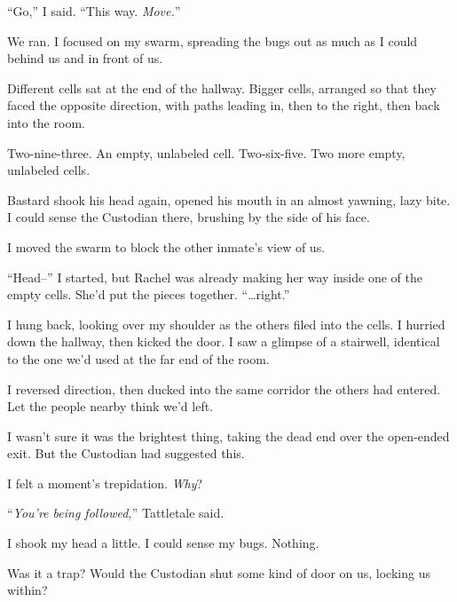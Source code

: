 ``Go,'' I said.  ``This way.  \emph{Move.}''



We ran.  I focused on my swarm, spreading the bugs out as much as I could behind us and in front of us.



Different cells sat at the end of the hallway.  Bigger cells, arranged so that they faced the opposite direction, with paths leading in, then to the right, then back into the room.



Two-nine-three.  An empty, unlabeled cell.  Two-six-five.  Two more empty, unlabeled cells.



Bastard shook his head again, opened his mouth in an almost yawning, lazy bite.  I could sense the Custodian there, brushing by the side of his face.



I moved the swarm to block the other inmate's view of us.



``Head--'' I started, but Rachel was already making her way inside one of the empty cells.  She'd put the pieces together.  ``\ldots{}right.''



I hung back, looking over my shoulder as the others filed into the cells.  I hurried down the hallway, then kicked the door.  I saw a glimpse of a stairwell, identical to the one we'd used at the far end of the room.



I reversed direction, then ducked into the same corridor the others had entered.  Let the people nearby think we'd left.



I wasn't sure it was the brightest thing, taking the dead end over the open-ended exit.  But the Custodian had suggested this.



I felt a moment's trepidation.  \emph{Why}?



``\emph{You're being followed,}'' Tattletale said.



I shook my head a little.  I could sense my bugs.  Nothing.



Was it a trap?  Would the Custodian shut some kind of door on us, locking us within?



